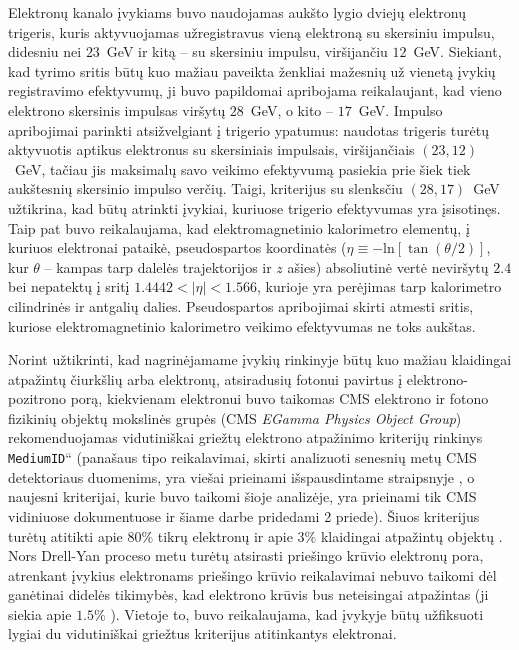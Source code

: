 \documentclass[a4paper, 12pt, oneside]{article}
\newcommand{\ttt}[1]{\texttt{#1}}
\newcommand{\ltq}[1]{{\quotedblbase{}#1\textquotedblleft{}}}
\newlength\q
\begin{document}
Elektronų kanalo įvykiams buvo naudojamas aukšto lygio dviejų elektronų trigeris, kuris aktyvuojamas užregistravus vieną elektroną
su skersiniu impulsu, didesniu nei $23$~GeV ir kitą -- su skersiniu impulsu, viršijančiu $12$~GeV.
Siekiant, kad tyrimo sritis būtų kuo mažiau paveikta ženkliai mažesnių už vienetą įvykių registravimo efektyvumų, ji buvo papildomai
apribojama reikalaujant, kad vieno elektrono skersinis impulsas viršytų $28$~GeV, o kito -- $17$~GeV.
Impulso apribojimai parinkti atsižvelgiant į trigerio ypatumus: naudotas trigeris turėtų aktyvuotis aptikus elektronus
su skersiniais impulsais, viršijančiais $(23, 12)$~GeV, tačiau jis maksimalų savo veikimo efektyvumą pasiekia prie šiek
tiek aukštesnių skersinio impulso verčių.
Taigi, kriterijus su slenksčiu $(28, 17)$~GeV užtikrina, kad būtų atrinkti įvykiai, kuriuose trigerio efektyvumas yra
įsisotinęs.
Taip pat buvo reikalaujama, kad elektromagnetinio kalorimetro elementų, į kuriuos elektronai pataikė, pseudospartos koordinatės
($\eta\equiv -\mathrm{ln}\left[\tan\left(\theta/2\right)\right]$, kur $\theta$ -- kampas tarp dalelės trajektorijos ir $z$ ašies)
absoliutinė vertė neviršytų $2.4$ bei nepatektų į sritį $1.4442<|\eta|<1.566$, kurioje yra perėjimas tarp kalorimetro
cilindrinės ir antgalių dalies.
Pseudospartos apribojimai skirti atmesti sritis, kuriose elektromagnetinio kalorimetro veikimo efektyvumas ne toks
aukštas.

Norint užtikrinti, kad nagrinėjamame įvykių rinkinyje būtų kuo mažiau klaidingai atpažintų čiurkšlių arba elektronų,
atsiradusių fotonui pavirtus į elektrono-pozitrono porą, kiekvienam elektronui buvo taikomas CMS elektrono ir fotono
fizikinių objektų mokslinės grupės (CMS \textit{EGamma Physics Object Group}) rekomenduojamas vidutiniškai griežtų
elektrono atpažinimo kriterijų rinkinys \ltq{\ttt{MediumID}} (panašaus tipo reikalavimai, skirti analizuoti senesnių
metų CMS detektoriaus duomenims, yra viešai prieinami išspausdintame straipsnyje \cite{EleID}, o naujesni kriterijai,
kurie buvo taikomi šioje analizėje, yra prieinami tik CMS vidiniuose dokumentuose ir šiame darbe pridedami 2 priede).
Šiuos kriterijus turėtų atitikti apie $80\%$ tikrų elektronų ir apie $3\%$ klaidingai atpažintų objektų \cite{EleID}.
Nors Drell-Yan proceso metu turėtų atsirasti priešingo krūvio elektronų pora, atrenkant įvykius elektronams priešingo
krūvio reikalavimai nebuvo taikomi dėl ganėtinai didelės tikimybės, kad elektrono krūvis bus neteisingai atpažintas
(ji siekia apie $1.5\%$ \cite{EleID}).
Vietoje to, buvo reikalaujama, kad įvykyje būtų užfiksuoti lygiai du vidutiniškai griežtus kriterijus atitinkantys
elektronai.
\end{document}
